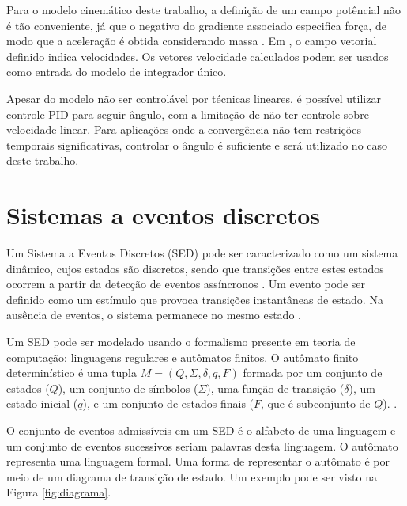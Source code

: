 Para o modelo cinemático deste trabalho, a definição de um campo potêncial não é
tão conveniente, já que o negativo do gradiente associado especifica
força, de modo que a aceleração é obtida considerando massa
\cite{art:wallfollowing, book:HallidayDaMassa}. Em ,
o campo vetorial definido indica velocidades. Os vetores velocidade calculados
podem ser usados como entrada do modelo de integrador único.

Apesar do modelo não ser controlável por técnicas lineares, é possível utilizar controle PID 
para seguir ângulo, com a limitação de não ter controle sobre velocidade linear. Para 
aplicações onde a convergência não tem restrições temporais significativas, controlar o ângulo
é suficiente e será utilizado no caso deste trabalho.


\section{Sistemas a eventos discretos}

Um Sistema a Eventos Discretos (SED) pode ser caracterizado como um sistema
dinâmico, cujos estados são discretos, sendo que transições entre estes estados ocorrem
a partir da detecção de eventos assíncronos \cite{book:SED}. Um evento pode ser
definido como um estímulo que provoca transições instantâneas de estado. Na
ausência de eventos, o sistema permanece no mesmo estado \cite{man:Cury}.

Um SED pode ser modelado usando o formalismo presente em teoria de computação:
linguagens regulares e autômatos finitos. O autômato finito determinístico é uma
tupla $M=(Q,\Sigma,\delta,q,F)$ formada por um conjunto de estados ($Q$), um conjunto
de símbolos ($\Sigma$), uma função de transição ($\delta$), um estado inicial
($q$), e um conjunto de estados finais ($F$, que é subconjunto de $Q$). \cite{book:SED,
book:TeoriaComp}.

O conjunto de eventos admissíveis em um SED é o alfabeto de uma linguagem e um
conjunto de eventos sucessivos seriam palavras desta linguagem. O autômato
representa uma linguagem formal. Uma forma de representar o autômato é por meio
de um diagrama de transição de estado. Um exemplo pode ser visto na Figura
\ref{fig:diagrama}.



